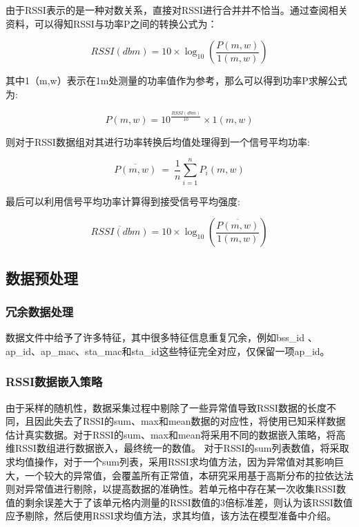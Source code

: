 由于RSSI表示的是一种对数关系，直接对RSSI进行合并并不恰当。通过查阅相关资料，可以得知RSSI与功率P之间的转换公式为：

\begin{equation}
	RSSI\left( dbm \right) =10\times \log _{10}\left( \frac{P\left( m,w \right)}{1\left( m,w \right)} \right) 
\end{equation}

其中1（m,w）表示在1m处测量的功率值作为参考，那么可以得到功率P求解公式为:

\begin{equation}
	P\left( m,w \right) =10^{\frac{RSSI\left( dbm \right)}{10}}\times 1\left( m,w \right) 
\end{equation}

则对于RSSI数据组对其进行功率转换后均值处理得到一个信号平均功率:

\begin{equation}
	\overline{P\left( m,w \right) }\ =\ \frac{1}{n}\sum_{i=1}^n{P_i\left( m,w \right)}
\end{equation}

最后可以利用信号平均功率计算得到接受信号平均强度:

\begin{equation}
	\overline{RSSI\left( dbm \right) }=10\times \log _{10}\left( \frac{\overline{P\left( m,w \right) }}{1\left( m,w \right)} \right) 
\end{equation}

\subsection{数据预处理}
\subsubsection{冗余数据处理}

数据文件中给予了许多特征，其中很多特征信息重复冗余，例如bss\_id 、 ap\_id、ap\_mac、sta\_mac和sta\_id这些特征完全对应，仅保留一项ap\_id。

\subsubsection{RSSI数据嵌入策略}

由于采样的随机性，数据采集过程中剔除了一些异常值导致RSSI数据的长度不同，且因此失去了RSSI的sum、max和mean数据的对应性，将使用已知采样数据估计真实数据。对于RSSI的sum、max和mean将采用不同的数据嵌入策略，将高维RSSI数组进行数据嵌入，最终统一的数值。
对于RSSI的sum列表数值，将采取求均值操作，对于一个sum列表，采用RSSI求均值方法，因为异常值对其影响巨大，一个较大的异常值，会覆盖所有正常值，本研究采用基于高斯分布的拉依达法则对异常值进行剔除，以提高数据的准确性。若单元格中存在某一次收集RSSI数值的剩余误差大于了该单元格内测量的RSSI数值的3倍标准差，则认为该RSSI数值应予剔除，然后使用RSSI求均值方法，求其均值，该方法在模型准备中介绍。

